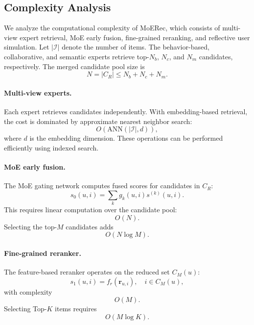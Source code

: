 \documentclass[sigconf,anonymous]{acmart}
\begin{document}
\subsection{Complexity Analysis}

We analyze the computational complexity of MoERec, which consists of multi-view expert retrieval, MoE early fusion, fine-grained reranking, and reflective user simulation. Let $|\mathcal{I}|$ denote the number of items. The behavior-based, collaborative, and semantic experts retrieve top-$N_b$, $N_c$, and $N_m$ candidates, respectively. The merged candidate pool size is
\begin{equation}
N = |C_R| \le N_b + N_c + N_m.
\end{equation}

\paragraph{Multi-view experts.}
Each expert retrieves candidates independently. With embedding-based retrieval, the cost is dominated by approximate nearest neighbor search:
\begin{equation}
O(\mathrm{ANN}(|\mathcal{I}|, d)),
\end{equation}
where $d$ is the embedding dimension. These operations can be performed efficiently using indexed search.

\paragraph{MoE early fusion.}
The MoE gating network computes fused scores for candidates in $C_R$:
\begin{equation}
s_0(u,i)=\sum_{k} g_k(u,i) s^{(k)}(u,i).
\end{equation}
This requires linear computation over the candidate pool:
\begin{equation}
O(N).
\end{equation}
Selecting the top-$M$ candidates adds
\begin{equation}
O(N \log M).
\end{equation}

\paragraph{Fine-grained reranker.}
The feature-based reranker operates on the reduced set $C_M(u)$:
\begin{equation}
s_1(u,i)=f_r(\mathbf{r}_{u,i}), \quad i \in C_M(u),
\end{equation}
with complexity
\begin{equation}
O(M).
\end{equation}
Selecting Top-$K$ items requires
\begin{equation}
O(M \log K).
\end{equation}
\end{document}

